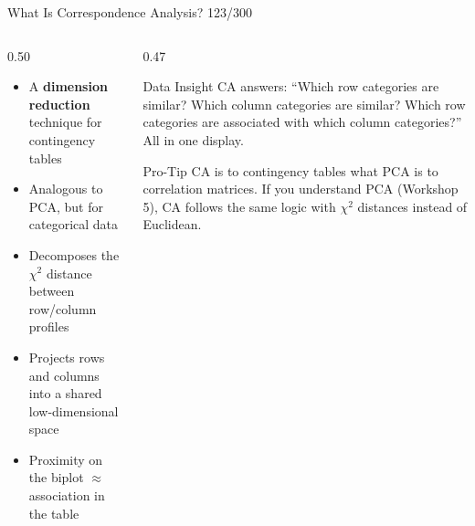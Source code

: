 \documentclass[10pt]{beamer}
\newcommand{\smark}[1]{\hfill{\scriptsize\color{codegray}#1}}
\begin{document}
\begin{frame}{What Is Correspondence Analysis?}
\smark{123/300}
\begin{columns}[T]
\begin{column}{0.50\textwidth}
\begin{itemize}
    \item A \textbf{dimension reduction} technique for contingency tables
    \item Analogous to PCA, but for categorical data
    \item Decomposes the $\chi^2$ distance between row/column profiles
    \item Projects rows and columns into a shared low-dimensional space
    \item Proximity on the biplot $\approx$ association in the table
\end{itemize}
\end{column}
\begin{column}{0.47\textwidth}
\begin{exampleblock}{Data Insight}
    \scriptsize CA answers: ``Which row categories are similar? Which column categories are similar? Which row categories are associated with which column categories?'' All in one display.
\end{exampleblock}
\vspace{0.1cm}
\begin{alertblock}{Pro-Tip}
    \scriptsize CA is to contingency tables what PCA is to correlation matrices. If you understand PCA (Workshop 5), CA follows the same logic with $\chi^2$ distances instead of Euclidean.
\end{alertblock}
\end{column}
\end{columns}
\end{frame}
\end{document}
